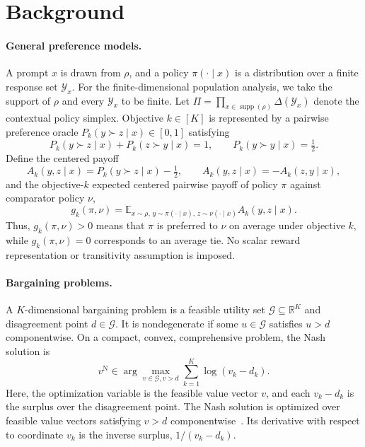 \documentclass{article}
\theoremstyle{remark}
\theoremstyle{plain}
\newcommand{\Y}{\mathcal{Y}}
\newcommand{\G}{\mathcal{G}}
\newcommand{\E}{\mathbb{E}}
\newcommand{\R}{\mathbb{R}}
\begin{document}
\section{Background}
\label{sec:background}
\paragraph{General preference models.}
A prompt $x$ is drawn from $\rho$, and a policy $\pi(\cdot\mid x)$ is a distribution over a finite response set $\Y_x$. For the finite-dimensional population analysis, we take the support of $\rho$ and every $\Y_x$ to be finite. Let $\Pi=\prod_{x\in\operatorname{supp}(\rho)}\Delta(\Y_x)$ denote the contextual policy simplex. Objective $k\in[K]$ is represented by a pairwise preference oracle $P_k(y\succ z\mid x)\in[0,1]$ satisfying
\begin{equation}
P_k(y\succ z\mid x)+P_k(z\succ y\mid x)=1,
\qquad P_k(y\succ y\mid x)=\tfrac12.
\label{eq:skew}
\end{equation}
Define the centered payoff
\begin{equation}
A_k(y,z\mid x)=P_k(y\succ z\mid x)-\tfrac12,
\qquad
A_k(y,z\mid x)=-A_k(z,y\mid x),
\label{eq:centered}
\end{equation}
and the objective-$k$ expected centered pairwise payoff of policy $\pi$ against comparator policy $\nu$,
\begin{equation}
g_k(\pi,\nu)
=\E_{x\sim\rho,\,y\sim\pi(\cdot\mid x),\,z\sim\nu(\cdot\mid x)}A_k(y,z\mid x).
\label{eq:game-payoff}
\end{equation}
Thus, $g_k(\pi,\nu)>0$ means that $\pi$ is preferred to $\nu$ on average under objective $k$, while $g_k(\pi,\nu)=0$ corresponds to an average tie. No scalar reward representation or transitivity assumption is imposed.

\paragraph{Bargaining problems.}
A $K$-dimensional bargaining problem is a feasible utility set $\G\subseteq\R^K$ and disagreement point $d\in\G$. It is nondegenerate if some $u\in\G$ satisfies $u>d$ componentwise. On a compact, convex, comprehensive problem, the Nash solution is
\begin{equation}
v^{\mathrm N}
\in
\arg\max_{v\in\G,v>d}
\sum_{k=1}^K\log(v_k-d_k).
\label{eq:classical-nash}
\end{equation}
Here, the optimization variable is the feasible value vector $v$, and each $v_k-d_k$ is the surplus over the disagreement point. The Nash solution is optimized over feasible value vectors satisfying $v>d$ componentwise~\citep{nash1950}. Its derivative with respect to coordinate $v_k$ is the inverse surplus, $1/(v_k-d_k)$.
\end{document}
